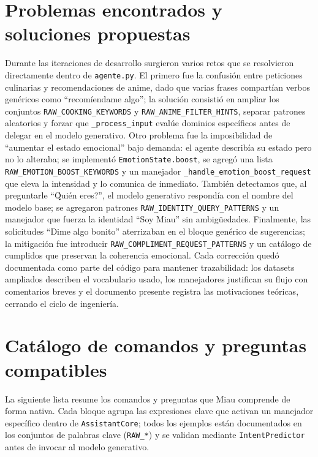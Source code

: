 \documentclass[a4paper,12pt]{article}
\begin{document}
\section{Problemas encontrados y soluciones propuestas}
Durante las iteraciones de desarrollo surgieron varios retos que se resolvieron directamente dentro de \texttt{agente.py}. El primero fue la confusi\'on entre peticiones culinarias y recomendaciones de anime, dado que varias frases compart\'ian verbos gen\'ericos como ``recom\'iendame algo''; la soluci\'on consisti\'o en ampliar los conjuntos \texttt{RAW\_COOKING\_KEYWORDS} y \texttt{RAW\_ANIME\_FILTER\_HINTS}, separar patrones aleatorios y forzar que \texttt{\_process\_input} eval\'ue dominios espec\'ificos antes de delegar en el modelo generativo. Otro problema fue la imposibilidad de ``aumentar el estado emocional'' bajo demanda: el agente describ\'ia su estado pero no lo alteraba; se implement\'o \texttt{EmotionState.boost}, se agreg\'o una lista \texttt{RAW\_EMOTION\_BOOST\_KEYWORDS} y un manejador \texttt{\_handle\_emotion\_boost\_request} que eleva la intensidad y lo comunica de inmediato. Tambi\'en detectamos que, al preguntarle ``\'Qui\'en eres?'', el modelo generativo respond\'ia con el nombre del modelo base; se agregaron patrones \texttt{RAW\_IDENTITY\_QUERY\_PATTERNS} y un manejador que fuerza la identidad ``Soy Miau'' sin ambig\"uedades. Finalmente, las solicitudes ``Dime algo bonito'' aterrizaban en el bloque gen\'erico de sugerencias; la mitigaci\'on fue introducir \texttt{RAW\_COMPLIMENT\_REQUEST\_PATTERNS} y un cat\'alogo de cumplidos que preservan la coherencia emocional. Cada correcci\'on qued\'o documentada como parte del c\'odigo para mantener trazabilidad: los datasets ampliados describen el vocabulario usado, los manejadores justifican su flujo con comentarios breves y el documento presente registra las motivaciones te\'oricas, cerrando el ciclo de ingenier\'ia.

\section{Cat\'alogo de comandos y preguntas compatibles}
La siguiente lista resume los comandos y preguntas que Miau comprende de forma nativa. Cada bloque agrupa las expresiones clave que activan un manejador espec\'ifico dentro de \texttt{AssistantCore}; todos los ejemplos est\'an documentados en los conjuntos de palabras clave (\texttt{RAW\_*}) y se validan mediante \texttt{IntentPredictor} antes de invocar al modelo generativo.
\end{document}

